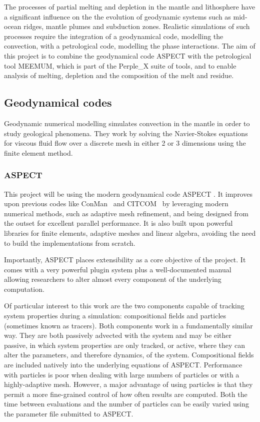 The processes of partial melting and depletion in the mantle and lithosphere have a significant influence on the the evolution of geodynamic systems such as mid-ocean ridges, mantle plumes and subduction zones.
Realistic simulations of such processes require the integration of a geodynamical code, modelling the convection, with a petrological code, modelling the phase interactions.
The aim of this project is to combine the geodynamical code ASPECT with the petrological tool MEEMUM, which is part of the Perple\_X suite of tools, and to enable analysis of melting, depletion and the composition of the melt and residue.

\subsection{Geodynamical codes}

Geodynamic numerical modelling simulates convection in the mantle in order to study geological phenomena. 
They work by solving the Navier-Stokes equations for viscous fluid flow over a discrete mesh in either 2 or 3 dimensions using the finite element method.

\subsubsection{ASPECT}

This project will be using the modern geodynamical code ASPECT \parencite{kronbichlerHighAccuracyMantle2012}.
It improves upon previous codes like ConMan~\parencite{king_conman_1990} and CITCOM~\parencite{moresi_accuracy_1996} by leveraging modern numerical methods, such as adaptive mesh refinement, and being designed from the outset for excellent parallel performance.
It is also built upon powerful libraries for finite elements, adaptive meshes and linear algebra, avoiding the need to build the implementations from scratch.

Importantly, ASPECT places extensibility as a core objective of the project.
It comes with a very powerful plugin system plus a well-documented manual allowing researchers to alter almost every component of the underlying computation.

Of particular interest to this work are the two components capable of tracking system properties during a simulation: compositional fields and particles (sometimes known as tracers). 
Both components work in a fundamentally similar way.
They are both passively advected with the system and may be either passive, in which system properties are only tracked, or active, where they can alter the parameters, and therefore dynamics, of the system.
Compositional fields are included natively into the underlying equations of ASPECT.
Performance with particles is poor when dealing with large numbers of particles or with a highly-adaptive mesh.
However, a major advantage of using particles is that they permit a more fine-grained control of how often results are computed.
Both the time between evaluations and the number of particles can be easily varied using the parameter file submitted to ASPECT.

